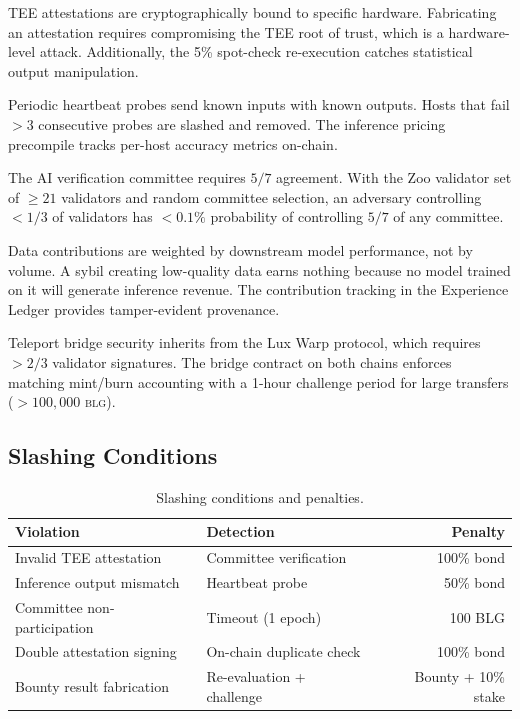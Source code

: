 \documentclass[11pt,letterpaper]{article}
\newcommand{\BLG}{\textsc{blg}}
\begin{document}
\begin{description}[style=nextline]
    \item[Against malicious trainers] TEE attestations are cryptographically bound to specific hardware. Fabricating an attestation requires compromising the TEE root of trust, which is a hardware-level attack. Additionally, the 5\% spot-check re-execution catches statistical output manipulation.

    \item[Against malicious hosts] Periodic heartbeat probes send known inputs with known outputs. Hosts that fail $> 3$ consecutive probes are slashed and removed. The inference pricing precompile tracks per-host accuracy metrics on-chain.

    \item[Against colluding validators] The AI verification committee requires $5/7$ agreement. With the Zoo validator set of $\geq 21$ validators and random committee selection, an adversary controlling $< 1/3$ of validators has $< 0.1\%$ probability of controlling $5/7$ of any committee.

    \item[Against sybil data contributors] Data contributions are weighted by downstream model performance, not by volume. A sybil creating low-quality data earns nothing because no model trained on it will generate inference revenue. The contribution tracking in the Experience Ledger \cite{zoo-experience-ledger} provides tamper-evident provenance.

    \item[Against bridge attackers] Teleport bridge security inherits from the Lux Warp protocol, which requires $> 2/3$ validator signatures. The bridge contract on both chains enforces matching mint/burn accounting with a 1-hour challenge period for large transfers ($> 100{,}000$ \BLG{}).
\end{description}

\subsection{Slashing Conditions}

\begin{table}[h]
\centering
\caption{Slashing conditions and penalties.}
\label{tab:slashing}
\begin{tabular}{@{}llr@{}}
\toprule
Violation & Detection & Penalty \\
\midrule
Invalid TEE attestation & Committee verification & 100\% bond \\
Inference output mismatch & Heartbeat probe & 50\% bond \\
Committee non-participation & Timeout (1 epoch) & 100 BLG \\
Double attestation signing & On-chain duplicate check & 100\% bond \\
Bounty result fabrication & Re-evaluation + challenge & Bounty + 10\% stake \\
\bottomrule
\end{tabular}
\end{table}
\end{document}
